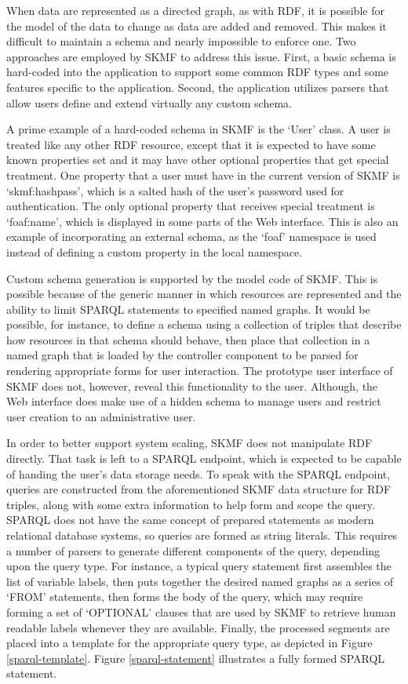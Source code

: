 When data are represented as a directed graph, as with RDF, it is possible for the model of the data to change as data are added and removed. This makes it difficult to maintain a schema and nearly impossible to enforce one. Two approaches are employed by SKMF to address this issue. First, a basic schema is hard-coded into the application to support some common RDF types and some features specific to the application. Second, the application utilizes parsers that allow users define and extend virtually any custom schema.

A prime example of a hard-coded schema in SKMF is the `User' class. A user is treated like any other RDF resource, except that it is expected to have some known properties set and it may have other optional properties that get special treatment. One property that a user must have in the current version of SKMF is `skmf:hashpass', which is a salted hash of the user's password used for authentication. The only optional property that receives special treatment is `foaf:name', which is displayed in some parts of the Web interface. This is also an example of incorporating an external schema, as the `foaf' namespace is used instead of defining a custom property in the local namespace.

Custom schema generation is supported by the model code of SKMF. This is possible because of the generic manner in which resources are represented and the ability to limit SPARQL statements to specified named graphs. It would be possible, for instance, to define a schema using a collection of triples that describe how resources in that schema should behave, then place that collection in a named graph that is loaded by the controller component to be parsed for rendering appropriate forms for user interaction. The prototype user interface of SKMF does not, however, reveal this functionality to the user. Although, the Web interface does make use of a hidden schema to manage users and restrict user creation to an administrative user.

In order to better support system scaling, SKMF does not manipulate RDF directly. That task is left to a SPARQL endpoint, which is expected to be capable of handing the user's data storage needs. To speak with the SPARQL endpoint, queries are constructed from the aforementioned SKMF data structure for RDF triples, along with some extra information to help form and scope the query. SPARQL does not have the same concept of prepared statements as modern relational database systems, so queries are formed as string literals. This requires a number of parsers to generate different components of the query, depending upon the query type. For instance, a typical query statement first assembles the list of variable labels, then puts together the desired named graphs as a series of `FROM' statements, then forms the body of the query, which may require forming a set of `OPTIONAL' clauses that are used by SKMF to retrieve human readable labels whenever they are available. Finally, the processed segments are placed into a template for the appropriate query type, as depicted in Figure \ref{sparql-template}. Figure \ref{sparql-statement} illustrates a fully formed SPARQL statement.

